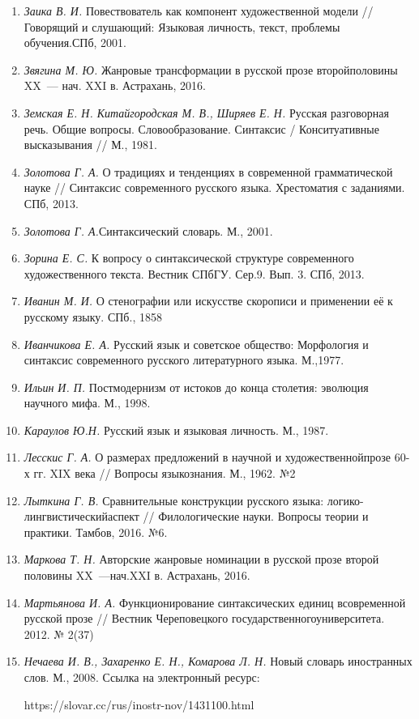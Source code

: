 \begin{enumerate}
        \item \textit{Заика В. И.} Повествователь как компонент художественной модели // Говорящий и слушающий: Языковая личность, текст, проблемы обучения.СПб, 2001.
        \item \textit{Звягина М. Ю.} Жанровые трансформации в русской прозе второйполовины XX~--- нач. XXI в. Астрахань, 2016.
        \item \textit{Земская Е. Н. Китайгородская М. В., Ширяев Е. Н. }Русская разговорная речь. Общие вопросы. Словообразование. Синтаксис / Конситуативные высказывания // М., 1981.
        \item \textit{Золотова Г. А.} О традициях и тенденциях в современной грамматической науке // Синтаксис современного русского языка. Хрестоматия с заданиями. СПб, 2013. 
        \item \textit{Золотова Г. А.}Синтаксический словарь. М., 2001.
        \item \textit{Зорина Е. С.} К вопросу о синтаксической структуре современного художественного текста. Вестник СПбГУ. Сер.9. Вып. 3. СПб, 2013.
        \item \textit{Иванин М. И. } О стенографии или искусстве скорописи и применении её к русскому языку. СПб., 1858
        \item \textit{Иванчикова Е. А.} {Русский язык и советское общество: Морфология и синтаксис современного русского литературного языка. М.,1977.}
        \item \textit{Ильин И. П.} Постмодернизм от истоков до конца столетия: эволюция научного мифа. М., 1998. 
        \item \textit{Караулов  Ю.Н.} {Русский язык и языковая личность. М., 1987. }
        \item \textit{Лесскис Г. А.} О размерах предложений в научной и художественнойпрозе 60-х гг. XIX века // Вопросы языкознания. М., 1962. №2
        \item \textit{Лыткина Г. В.} Сравнительные конструкции русского языка: логико-лингвистическийаспект // Филологические науки. Вопросы теории и практики. Тамбов, 2016. №6.
        \item \textit{Маркова Т. Н.} Авторские жанровые номинации в русской прозе второй половины XX~---нач.XXI в. Астрахань, 2016.
        \item \textit{Мартьянова И. А.} Функционирование синтаксических единиц всовременной русской прозе // Вестник Череповецкого государственногоуниверситета. 2012. № 2(37)
        \item \textit{Нечаева И. В., Захаренко Е. Н., Комарова Л. Н.} Новый словарь иностранных слов. М., 2008. Ссылка на электронный ресурс:\par https://slovar.cc/rus/inostr-nov/1431100.html

\end{enumerate}
